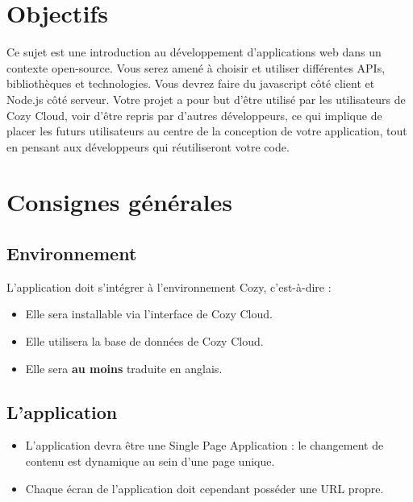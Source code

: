 \documentclass{42-fr}
\begin{document}
\chapter{Objectifs}


	Ce sujet est une introduction au d\'eveloppement d'applications web dans un contexte
	open-source. Vous serez amen\'e \`a choisir et utiliser diff\'erentes APIs,
	biblioth\`eques et technologies. Vous devrez faire du javascript c\^ot\'e
	client et Node.js c\^ot\'e serveur. Votre projet a pour but d'\^etre utilis\'e
	par les utilisateurs de Cozy Cloud, voir d'\^etre repris par d'autres
	d\'eveloppeurs, ce qui implique de placer les futurs utilisateurs au centre
	de la conception de votre application, tout en pensant aux d\'eveloppeurs qui
	r\'eutiliseront votre code.


\chapter{Consignes g\'en\'erales}


    \section{Environnement}
        L'application doit s'int\'egrer \`a l'environnement Cozy, c'est-\`a-dire :

        \begin{itemize}\itemsep1pt
            \item Elle sera installable via l'interface de Cozy Cloud.
            \item Elle utilisera la base de donn\'ees de Cozy Cloud.
            \item Elle sera \textbf{au moins} traduite en anglais.
        \end{itemize}

    \section{L'application}
        \begin{itemize}\itemsep1pt
            \item L'application devra \^etre une Single Page Application :
				le changement de contenu est dynamique au sein d'une page unique.
            \item Chaque \'ecran de l'application doit cependant poss\'eder une URL propre.
        \end{itemize}
\end{document}
